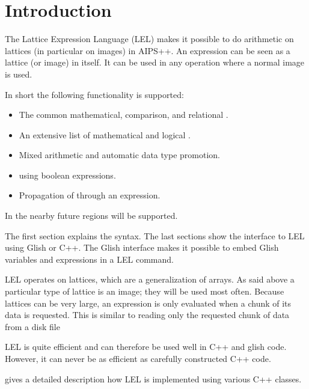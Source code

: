 

\section{Introduction}
The Lattice Expression Language (LEL) makes it possible to do
arithmetic on lattices (in particular on images) in AIPS++.
An expression can be seen as a lattice (or image) in itself. It
can be used in any operation where a normal image is used.

In short the following functionality is supported:
\begin{itemize}
\item The common mathematical, comparison, and relational
      .
\item An extensive list of mathematical and logical
      .
\item Mixed  arithmetic
      and automatic data type promotion.
\item {} using boolean expressions.
\item Propagation of  through an expression.
\end{itemize}
In the nearby future regions will be supported.

The first section explains the syntax.
The last sections show the interface to LEL using Glish or C++.
The Glish interface makes it possible to embed Glish
variables and expressions in a LEL command.

LEL operates on lattices, which are a generalization of arrays.
As said above a particular type of lattice is an image; they
will be used most often.
Because lattices can be very large, an expression is only evaluated
when a chunk of its data is requested. This is similar to reading
only the requested chunk of data from a disk file

LEL is quite efficient and can therefore be used well in
C++ and glish code. However, it can never be as efficient as
carefully constructed C++ code. 

 gives a detailed
description how LEL is implemented using various C++ classes.


